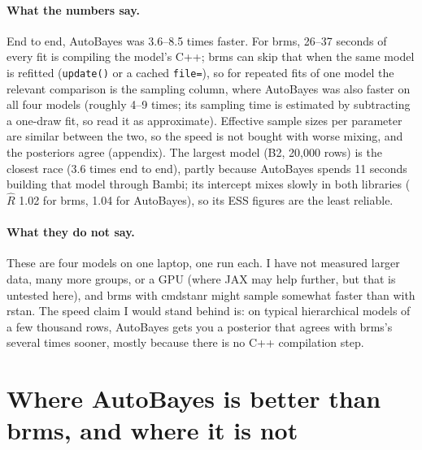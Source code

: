 \documentclass[11pt]{article}
\newcommand{\code}[1]{\texttt{#1}}
\begin{document}
\paragraph{What the numbers say.} End to end, AutoBayes was 3.6--8.5 times faster. For brms, 26--37 seconds of every
fit is compiling the model's C++; brms can skip that when the same model is refitted (\code{update()} or a cached
\code{file=}), so for repeated fits of one model the relevant comparison is the sampling column, where AutoBayes was
also faster on all four models (roughly 4--9 times; its sampling time is estimated by subtracting a one-draw fit, so
read it as approximate). Effective sample sizes per parameter are similar between the two, so the speed is not bought
with worse mixing, and the posteriors agree (appendix). The largest model (B2, 20{,}000 rows) is the closest race
(3.6 times end to end), partly because AutoBayes spends 11 seconds building that model through Bambi; its intercept
mixes slowly in both libraries ($\hat R$ 1.02 for brms, 1.04 for AutoBayes), so its ESS figures are the least reliable.

\paragraph{What they do not say.} These are four models on one laptop, one run each. I have not measured larger
data, many more groups, or a GPU (where JAX may help further, but that is untested here), and brms with cmdstanr
might sample somewhat faster than with rstan. The speed claim I would stand behind is: on typical hierarchical models
of a few thousand rows, AutoBayes gets you a posterior that agrees with brms's several times sooner, mostly because
there is no C++ compilation step.

\section{Where AutoBayes is better than brms, and where it is not}
\label{sec:better}
\end{document}
